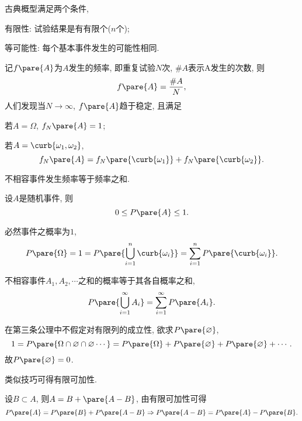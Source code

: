 \documentclass{ctexart}
\begin{document}
\begin{definition}[古典概型]
    古典概型满足两个条件,
    \begin{cenum}
        \item 有限性: 试验结果是有有限个($n$个);
        \item 等可能性: 每个基本事件发生的可能性相同.
    \end{cenum}
\end{definition}
记$f\pare{A}$为$A$发生的频率, 即重复试验$N$次, $\#A$表示A发生的次数, 则
\[ f\pare{A} = \frac{\# A}{N}, \]
人们发现当$N\rightarrow \infty$, $f\pare{A}$趋于稳定, 且满足
\begin{cenum}
    \item 若$A=\Omega$, $f_N\pare{A} = 1$;
    \item 若$A=\curb{\omega_1,\omega_2}$,
    \[ f_N\pare{A} = f_N\pare{\curb{\omega_1}} + f_N\pare{\curb{\omega_2}}. \]
    \item 不相容事件发生频率等于频率之和.
\end{cenum}
\begin{finale}
    \begin{axiom}[概率的公理化定义]
        \mbox{}
        \begin{cenum}
            \item 设$A$是随机事件, 则
            \[ 0\le P\pare{A} \le 1. \]
            \item 必然事件之概率为$1$,
            \[ P\pare{\Omega} = 1 = P\pare{\bigcup_{i=1}^n \curb{\omega_i}} = \sum_{i=1}^n P\pare{\curb{\omega_i}}. \]
            \item 不相容事件$A_1,A_2,\cdots$之和的概率等于其各自概率之和,
            \[ P\pare{\bigcup_{i=1}^\infty A_i} = \sum_{i=1}^\infty P\pare{A_i}. \]
        \end{cenum}
    \end{axiom}
\end{finale}
\begin{sample}
    \begin{ex}
        在第三条公理中不假定对有限列的成立性, 欲求$P\pare{\varnothing}$,
        \[ 1 = P\pare{\Omega \cap \varnothing \cap \varnothing \cdots} = P\pare{\Omega} + P\pare{\varnothing} + P\pare{\varnothing} + \cdots. \]
        故$P\pare{\varnothing} = 0$.
    \end{ex}
    \begin{ex}
        类似技巧可得有限可加性.
    \end{ex}
    \begin{ex}
        设$B\subset A$, 则$A = B + \pare{A-B}$, 由有限可加性可得
        \[ P\pare{A} = P\pare{B} + P\pare{A-B} \Rightarrow P\pare{A-B} = P\pare{A} - P\pare{B}. \]
    \end{ex}
\end{sample}
\end{document}
